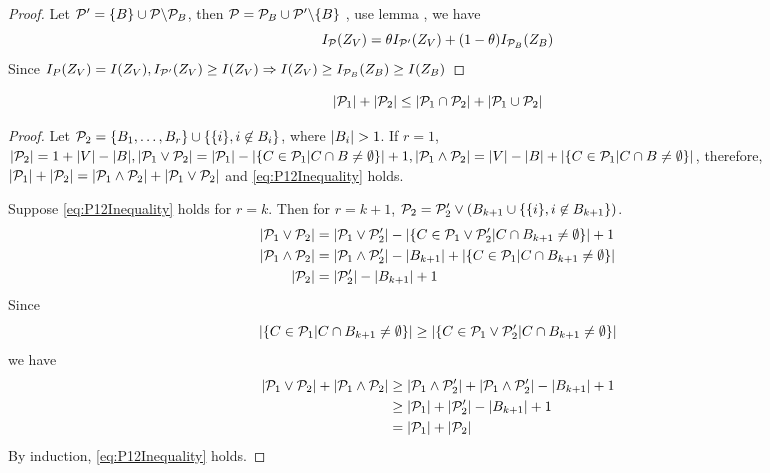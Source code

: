 \begin{proof}
Let $\P' = \{B\} \cup \P\backslash \P_B$, then $\P = \P_B \cup \P'\backslash\{B\}$ , use lemma , we have
\begin{equation}
I_{\P}(Z_V) = \theta I_{\P'}(Z_V) + (1-\theta) I_{\P_B}(Z_B)
\end{equation}
Since  $I_{P}(Z_V) = I(Z_V), I_{\P'}(Z_V)\geq I(Z_V) \Rightarrow I(Z_V) \geq I_{\P_B}(Z_B) \geq I(Z_B)$ 
\end{proof}
\begin{lemma}
\begin{equation}\label{eq:P12Inequality}
\abs{\P_1} + \abs{\P_2} \leq \abs{\P_1 \cap \P_2} + \abs{\P_1 \cup \P_2}
\end{equation}
\end{lemma}
\begin{proof}
Let $\P_2 = \{B_1, \dots, B_r\} \cup \{\{i\}, i\not\in B_i\}$, where $\abs{B_i}>1$.
If $r=1$, 
$\abs{\P_2} = 1+ \abs{V} - \abs{B}, \abs{\P_1 \vee \P_2} = \abs{\P_1} - \abs{\{C\in \P_1 | C\cap B \neq \emptyset \}}+1, \abs{\P_1 \wedge \P_2} = \abs{V} - \abs{B} + \abs{\{C\in \P_1 | C\cap B \neq \emptyset \}}$,
 therefore, $\abs{\P_1} + \abs{\P_2} = \abs{\P_1 \wedge \P_2} + \abs{\P_1 \vee \P_2}$
and \eqref{eq:P12Inequality} holds.

Suppose \eqref{eq:P12Inequality} holds for $r=k$. Then for $r=k+1$,
$\P_2 = \P'_2 \vee (B_{k+1} \cup \{ \{i\}, i\not\in B_{k+1} \})$.
\begin{align*}
\abs{\P_1 \vee \P_2} & = \abs{\P_1 \vee \P'_2} - \abs{\{C\in \P_1 \vee \P'_2 | C\cap B_{k+1}\neq \emptyset \}}+1 \\
\abs{\P_1 \wedge \P_2} & = \abs{\P_1 \wedge \P'_2} - \abs{B_{k+1}} +  \abs{\{C\in \P_1 | C\cap B_{k+1}\neq \emptyset \}} \\
\abs{\P_2} & = \abs{\P'_2} -\abs{B_{k+1}} +1
\end{align*}
Since 
$$
  \abs{\{C\in \P_1 | C\cap B_{k+1}\neq \emptyset \}}
  \geq
  \abs{\{C\in \P_1 \vee \P'_2 | C\cap B_{k+1}\neq \emptyset \}}
$$
we have
\begin{align*}
	\abs{\P_1 \vee \P_2} + \abs{\P_1 \wedge \P_2} & \geq \abs{\P_1 \wedge \P'_2} + \abs{\P_1 \wedge \P'_2}
	- \abs{B_{k+1}} + 1 \\
	& \geq \abs{\P_1} + \abs{\P'_2} - \abs{B_{k+1}} + 1  \\
	& = \abs{\P_1} + \abs{\P_2}	
\end{align*}
By induction, \eqref{eq:P12Inequality} holds.
\end{proof}

